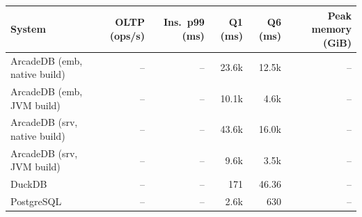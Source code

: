 \begin{tabular}{lrrrrr}
\toprule
System & OLTP (ops/s) & Ins.\ p99 (ms) & Q1 (ms) & Q6 (ms) & Peak memory (GiB) \\
\midrule
ArcadeDB (emb, native build) & -- & -- & 23.6k & 12.5k & -- \\
ArcadeDB (emb, JVM build) & -- & -- & 10.1k & 4.6k & -- \\
ArcadeDB (srv, native build) & -- & -- & 43.6k & 16.0k & -- \\
ArcadeDB (srv, JVM build) & -- & -- & 9.6k & 3.5k & -- \\
DuckDB & -- & -- & 171 & 46.36 & -- \\
PostgreSQL & -- & -- & 2.6k & 630 & -- \\
\bottomrule
\end{tabular}
